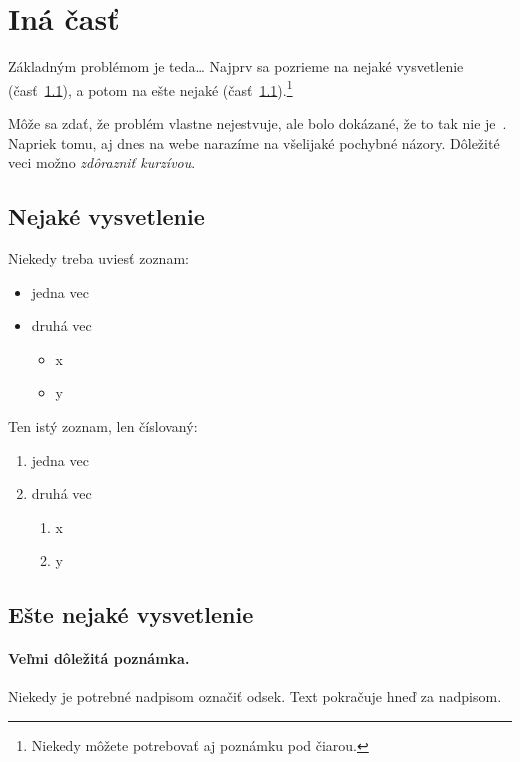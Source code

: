 \documentclass[10pt,twocolumn,twoside,slovak,a4paper]{article}
\begin{document}
\section{Iná časť} \label{ina}

Základným problémom je teda\ldots{} Najprv sa pozrieme na nejaké vysvetlenie (časť~\ref{ina:nejake}), a potom na ešte nejaké (časť~\ref{ina:nejake}).\footnote{Niekedy môžete potrebovať aj poznámku pod čiarou.}

Môže sa zdať, že problém vlastne nejestvuje\cite{Coplien:MPD}, ale bolo dokázané, že to tak nie je~\cite{Czarnecki:Staged, Czarnecki:Progress}. Napriek tomu, aj dnes na webe narazíme na všelijaké pochybné názory\cite{PLP-Framework}. Dôležité veci možno \emph{zdôrazniť kurzívou}.


\subsection{Nejaké vysvetlenie} \label{ina:nejake}

Niekedy treba uviesť zoznam:

\begin{itemize}
\item jedna vec
\item druhá vec
	\begin{itemize}
	\item x
	\item y
	\end{itemize}
\end{itemize}

Ten istý zoznam, len číslovaný:

\begin{enumerate}
\item jedna vec
\item druhá vec
	\begin{enumerate}
	\item x
	\item y
	\end{enumerate}
\end{enumerate}


\subsection{Ešte nejaké vysvetlenie} \label{ina:este}

\paragraph{Veľmi dôležitá poznámka.}
Niekedy je potrebné nadpisom označiť odsek. Text pokračuje hneď za nadpisom.
\end{document}
